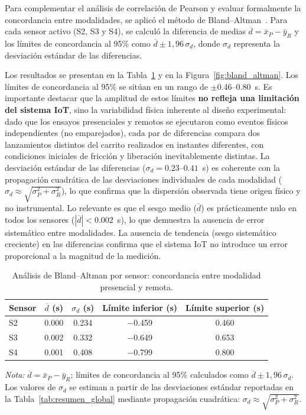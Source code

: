 \documentclass[journal,article,submit,pdftex]{Definitions/mdpi}
\begin{document}
Para complementar el an\'{a}lisis de correlaci\'{o}n de Pearson y
evaluar formalmente la concordancia entre modalidades, se
aplic\'{o} el m\'{e}todo de Bland--Altman~\cite{bland1986}. Para cada
sensor activo (S2, S3 y S4), se calcul\'{o} la diferencia de
medias $\overline{d} = \bar{x}_P - \bar{y}_R$ y los
l\'{i}mites de concordancia al 95\% como
$\overline{d} \pm 1{,}96\,\sigma_d$, donde $\sigma_d$
representa la desviaci\'{o}n est\'{a}ndar de las diferencias.

Los resultados se presentan en la Tabla~\ref{tab:bland_altman} y en la Figura~\ref{fig:bland_altman}.
Los l\'{i}mites de concordancia al 95\% se sit\'{u}an en un rango de
$\pm$0.46--0.80~s. Es importante destacar que la amplitud de estos
l\'{i}mites \textbf{no refleja una limitaci\'{o}n del sistema IoT}, sino
la variabilidad f\'{i}sica inherente al dise\~no experimental: dado que
los ensayos presenciales y remotos se ejecutaron como eventos f\'{i}sicos
independientes (no emparejados), cada par de diferencias compara dos
lanzamientos distintos del carrito realizados en instantes diferentes,
con condiciones iniciales de fricci\'{o}n y liberaci\'{o}n inevitablemente
distintas. La desviaci\'{o}n est\'{a}ndar de las diferencias
($\sigma_d = 0.23$--$0.41$~s) es coherente con la propagaci\'{o}n
cuadr\'{a}tica de las desviaciones individuales de cada modalidad
($\sigma_d \approx \sqrt{\sigma_P^2 + \sigma_R^2}$), lo que confirma
que la dispersi\'{o}n observada tiene origen f\'{i}sico y no instrumental.
Lo relevante es que el sesgo medio ($\overline{d}$) es pr\'{a}cticamente
nulo en todos los sensores ($|\overline{d}| < 0.002$~s), lo que demuestra
la ausencia de error sistem\'{a}tico entre modalidades.
La ausencia de tendencia (sesgo sistem\'{a}tico creciente) en
las diferencias confirma que el sistema IoT no introduce
un error proporcional a la magnitud de la medici\'{o}n.

\begin{table}[H]
\caption{An\'{a}lisis de Bland--Altman por sensor:
concordancia entre modalidad presencial y remota.}
\label{tab:bland_altman}
\centering
\small
\begin{tabular}{lcccc}
\toprule
\textbf{Sensor} &
\textbf{$\overline{d}$ (s)} &
\textbf{$\sigma_d$ (s)} &
\textbf{L\'{i}mite inferior (s)} &
\textbf{L\'{i}mite superior (s)} \\
\midrule
S2 & 0.000 & 0.234 & $-$0.459 & 0.460 \\
S3 & 0.002 & 0.332 & $-$0.649 & 0.653 \\
S4 & 0.001 & 0.408 & $-$0.799 & 0.800 \\
\bottomrule
\end{tabular}
\par\smallskip
{\footnotesize\noindent\textit{Nota:}
$\overline{d} = \bar{x}_P - \bar{y}_R$;
l\'{i}mites de concordancia al 95\% calculados como
$\overline{d} \pm 1{,}96\,\sigma_d$.
Los valores de $\sigma_d$ se estiman a partir de las
desviaciones est\'{a}ndar reportadas en la Tabla~\ref{tab:resumen_global}
mediante propagaci\'{o}n cuadr\'{a}tica:
$\sigma_d \approx \sqrt{\sigma_P^2 + \sigma_R^2}$.}
\end{table}
\end{document}
